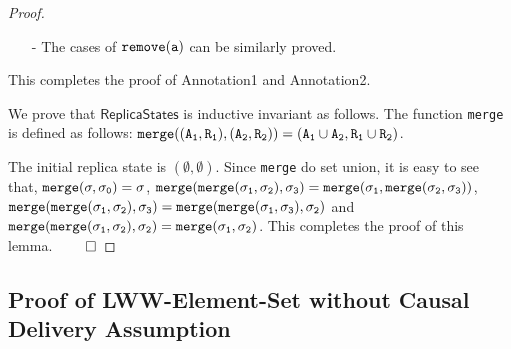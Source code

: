 \begin {proof}
\begin{itemize}
    \begin{itemize}
    \setlength{\itemsep}{0.5pt}
    \item[-] If $\alabel \in \alabelset_S$: For each operation $\alabel'$, such that $(\alabel',\alabel) \in \avisord$, since the visibility relation is transitive, we can see that, $\alabel' \in \alabelset_S$. By Annotation1 of $\alabel$ and such $\alabel'$, and Annotation2 of $S$, we can see that, $A_a \subseteq A$ and $R_a \subseteq R$. Therefore, $A' = A$, $R' = R$, and we can see that Annotation2 holds for $S'$.

    \item[-] If $\alabel \notin \alabelset_S$: Let $\alabelset'_S$ be the $\alabelset$ of $S'$. We can see that, $\alabelset'_S = \alabelset_S \cup \alabel \cup \avisord^{-1}(\alabel)$. By Annotation1 of $(A_a,R_a)$ and Annotation2 of $S$, we can see that Annotation2 holds for $S'$.
    \end{itemize}

\item[-] The cases of $\alabelshort[{\tt remove}]{a}$ can be similarly proved.
\end{itemize}

This completes the proof of Annotation1 and Annotation2.

We prove that $\mathsf{ReplicaStates}$ is inductive invariant as follows. The function {\tt merge} is defined as follows: $\alabelshort[{\tt merge}]{(A_1,R_1),(A_2,R_2)} = (A_1 \cup A_2, R_1 \cup R_2)$.

The initial replica state is $(\emptyset,\emptyset)$. Since {\tt merge} do set union, it is easy to see that, $\alabelshort[{\tt merge}]{\astate,\astate_0} = \astate$, $\alabelshort[{\tt merge}]{\alabelshort[{\tt merge}]{\astate_1,\astate_2},\astate_3} = \alabelshort[{\tt merge}]{\astate_1, \alabelshort[{\tt merge}]{\astate_2,\astate_3}}$, $\alabelshort[{\tt merge}]{\alabelshort[{\tt merge}]{\astate_1,\astate_2},\astate_3} = \alabelshort[{\tt merge}]{\alabelshort[{\tt merge}]{\astate_1,\astate_3},\astate_2}$ and $\alabelshort[{\tt merge}]{\alabelshort[{\tt merge}]{\astate_1,\astate_2},\astate_2} = \alabelshort[{\tt merge}]{\astate_1,\astate_2}$. This completes the proof of this lemma. $\qed$
\end {proof}






\subsection{Proof of LWW-Element-Set without Causal Delivery Assumption}
\label{subsec:proof of LWW-element-set without causal delivery assumption}

